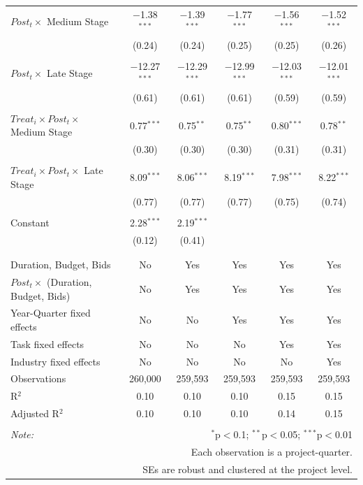 \documentclass[
]{article}
\begin{document}
\begin{table}[H]
\begin{tabular}{@{\extracolsep{-2pt}}lccccc}
 $Post_t \times$ Medium Stage & $-$1.38$^{***}$ & $-$1.39$^{***}$ & $-$1.77$^{***}$ & $-$1.56$^{***}$ & $-$1.52$^{***}$ \\ 
  & (0.24) & (0.24) & (0.25) & (0.25) & (0.26) \\ 
  & & & & & \\ 
 $Post_t \times$ Late Stage & $-$12.27$^{***}$ & $-$12.29$^{***}$ & $-$12.99$^{***}$ & $-$12.03$^{***}$ & $-$12.01$^{***}$ \\ 
  & (0.61) & (0.61) & (0.61) & (0.59) & (0.59) \\ 
  & & & & & \\ 
 $Treat_i \times Post_t \times$ Medium Stage & 0.77$^{***}$ & 0.75$^{**}$ & 0.75$^{**}$ & 0.80$^{***}$ & 0.78$^{**}$ \\ 
  & (0.30) & (0.30) & (0.30) & (0.31) & (0.31) \\ 
  & & & & & \\ 
 $Treat_i \times Post_t \times$ Late Stage & 8.09$^{***}$ & 8.06$^{***}$ & 8.19$^{***}$ & 7.98$^{***}$ & 8.22$^{***}$ \\ 
  & (0.77) & (0.77) & (0.77) & (0.75) & (0.74) \\ 
  & & & & & \\ 
 Constant & 2.28$^{***}$ & 2.19$^{***}$ &  &  &  \\ 
  & (0.12) & (0.41) &  &  &  \\ 
  & & & & & \\ 
\hline \\[-1.8ex] 
Duration, Budget, Bids & No & Yes & Yes & Yes & Yes \\ 
$Post_t \times $  (Duration, Budget, Bids) & No & Yes & Yes & Yes & Yes \\ 
Year-Quarter fixed effects & No & No & Yes & Yes & Yes \\ 
Task fixed effects & No & No & No & Yes & Yes \\ 
Industry fixed effects & No & No & No & No & Yes \\ 
Observations & 260,000 & 259,593 & 259,593 & 259,593 & 259,593 \\ 
R$^{2}$ & 0.10 & 0.10 & 0.10 & 0.15 & 0.15 \\ 
Adjusted R$^{2}$ & 0.10 & 0.10 & 0.10 & 0.14 & 0.15 \\ 
\hline 
\hline \\[-1.8ex] 
\textit{Note:}  & \multicolumn{5}{r}{$^{*}$p$<$0.1; $^{**}$p$<$0.05; $^{***}$p$<$0.01} \\ 
 & \multicolumn{5}{r}{Each observation is a project-quarter.} \\ 
 & \multicolumn{5}{r}{SEs are robust and clustered at the project level.} \\ 
\end{tabular} 
\end{table}
\end{document}
